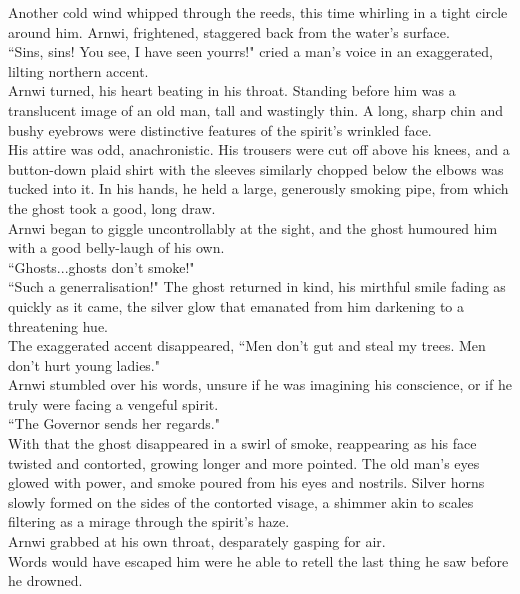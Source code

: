 Another cold wind whipped through the reeds, this time whirling in a tight circle around him.
Arnwi, frightened, staggered back from the water's surface.\\

``Sins, sins! You see, I have seen yourrs!" cried a man's voice in an exaggerated, lilting northern accent.\\
Arnwi turned, his heart beating in his throat.
Standing before him was a translucent image of an old man, tall and wastingly thin.
A long, sharp chin and bushy eyebrows were distinctive features of the spirit's wrinkled face.\\
His attire was odd, anachronistic.
His trousers were cut off above his knees, and a button-down plaid shirt with the sleeves similarly chopped below the elbows was tucked into it.
In his hands, he held a large, generously smoking pipe, from which the ghost took a good, long draw.\\

Arnwi began to giggle uncontrollably at the sight, and the ghost humoured him with a good belly-laugh of his own.\\
``Ghosts...ghosts don't smoke!" \\
``Such a generralisation!" The ghost returned in kind, his mirthful smile fading as quickly as it came, the silver glow that emanated from him darkening to a threatening hue.\\
The exaggerated accent disappeared, ``Men don't gut and steal my trees. Men don't hurt young ladies."\\
Arnwi stumbled over his words, unsure if he was imagining his conscience, or if he truly were facing a vengeful spirit.\\

``The Governor sends her regards."\\

With that the ghost disappeared in a swirl of smoke, reappearing as his face twisted and contorted, growing longer and more pointed.
The old man's eyes glowed with power, and smoke poured from his eyes and nostrils.
Silver horns slowly formed on the sides of the contorted visage, a shimmer akin to scales filtering as a mirage through the spirit's haze.\\

Arnwi grabbed at his own throat, desparately gasping for air.\\

Words would have escaped him were he able to retell the last thing he saw before he drowned.